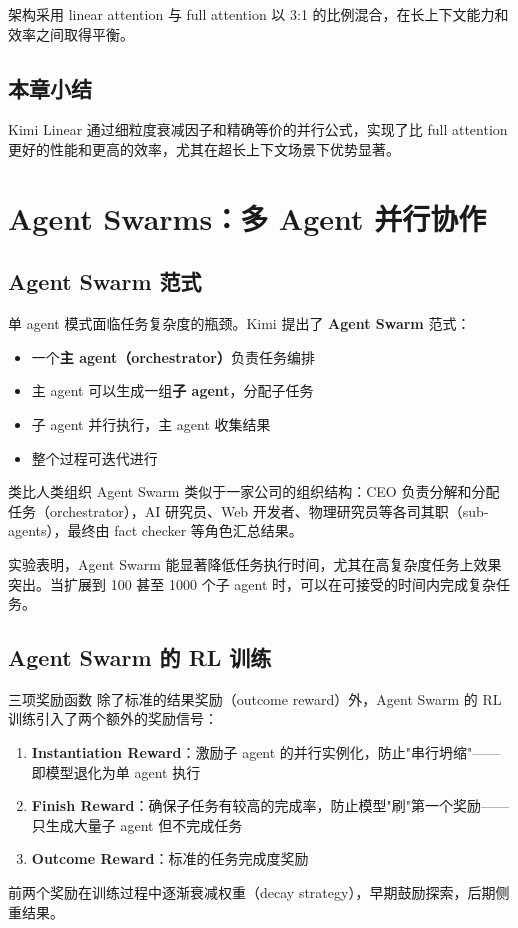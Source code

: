 \documentclass[a4paper]{article}
\begin{document}
架构采用 linear attention 与 full attention 以 3:1 的比例混合，在长上下文能力和效率之间取得平衡。

\subsection{本章小结}

Kimi Linear 通过细粒度衰减因子和精确等价的并行公式，实现了比 full attention 更好的性能和更高的效率，尤其在超长上下文场景下优势显著。


\section{Agent Swarms：多 Agent 并行协作}

\subsection{Agent Swarm 范式}

单 agent 模式面临任务复杂度的瓶颈。Kimi 提出了 \textbf{Agent Swarm} 范式：

\begin{itemize}
    \item 一个\textbf{主 agent（orchestrator）}负责任务编排
    \item 主 agent 可以生成一组\textbf{子 agent}，分配子任务
    \item 子 agent 并行执行，主 agent 收集结果
    \item 整个过程可迭代进行
\end{itemize}

\begin{knowledgebox}{类比人类组织}
Agent Swarm 类似于一家公司的组织结构：CEO 负责分解和分配任务（orchestrator），AI 研究员、Web 开发者、物理研究员等各司其职（sub-agents），最终由 fact checker 等角色汇总结果。
\end{knowledgebox}

实验表明，Agent Swarm 能显著降低任务执行时间，尤其在高复杂度任务上效果突出。当扩展到 100 甚至 1000 个子 agent 时，可以在可接受的时间内完成复杂任务。

\subsection{Agent Swarm 的 RL 训练}

\begin{importantbox}{三项奖励函数}
除了标准的结果奖励（outcome reward）外，Agent Swarm 的 RL 训练引入了两个额外的奖励信号：
\begin{enumerate}
    \item \textbf{Instantiation Reward}：激励子 agent 的并行实例化，防止"串行坍缩"——即模型退化为单 agent 执行
    \item \textbf{Finish Reward}：确保子任务有较高的完成率，防止模型"刷"第一个奖励——只生成大量子 agent 但不完成任务
    \item \textbf{Outcome Reward}：标准的任务完成度奖励
\end{enumerate}
前两个奖励在训练过程中逐渐衰减权重（decay strategy），早期鼓励探索，后期侧重结果。
\end{importantbox}
\end{document}
